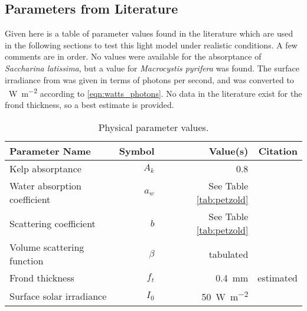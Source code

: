 \subsection{Parameters from Literature}
Given here is a table of parameter values found in the literature which are used in the following sections to test this light model under realistic conditions.
A few comments are in order.
No values were available for the absorptance of \textit{Saccharina latissima}, but a value for \textit{Macrocystis pyrifera} was found.
The surface irradiance from \cite{broch_modelling_2012} was given in terms of photons per second,
and was converted to \SI{}{\W\per\m\squared} according to \eqref{eqn:watts_photons}.
No data in the literature exist for the frond thickness, so a best estimate is provided.

\begin{table}[h]
  \centering
  \caption{Physical parameter values.}
  \begin{tabular}{lrrr}
    \toprule
    Parameter Name & Symbol & Value(s) & Citation \\ %
    \midrule
    Kelp absorptance & $A_k$ & 0.8 & \cite{colombo-pallotta_photosynthetic_2006} \\%
    Water absorption coefficient & $a_w$ & See Table \ref{tab:petzold} & \cite{petzold_volume_1972} \\%
    Scattering coefficient & $b$  & See Table \ref{tab:petzold} & \cite{petzold_volume_1972} \\%
    Volume scattering function & $\beta$ & tabulated & \cite{petzold_volume_1972,sokolov_parameterization_2010} \\%
    Frond thickness & $f_t$ & \SI{0.4}{\mm} & estimated \\
    Surface solar irradiance & $I_0$ & \SI{50}{\W\per\m\squared} & \cite{broch_modelling_2012}  \\%
    \bottomrule
  \end{tabular}
  \label{tab:params}
\end{table}

